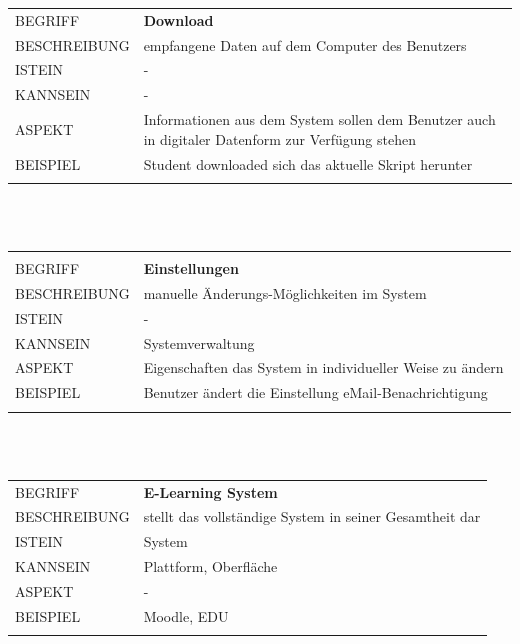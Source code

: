 \documentclass[12pt,a4paper]{article}
\begin{document}
\begin{tabular}{l p{12cm}}
	BEGRIFF 	 & \textbf{Download} \\ 
	BESCHREIBUNG & empfangene Daten auf dem Computer des Benutzers\\ 
	ISTEIN   	 & -\\
	KANNSEIN 	 & -\\ 
	ASPEKT   	 & Informationen aus dem System sollen dem Benutzer auch in digitaler Datenform zur Verfügung stehen\\
	BEISPIEL 	 & Student downloaded sich das aktuelle Skript herunter\\\\
	\hline
\end{tabular}\\\\  

\begin{tabular}{l p{12cm}}
	\hline\\
	BEGRIFF 	 & \textbf{Einstellungen} \\ 
	BESCHREIBUNG & manuelle Änderungs-Möglichkeiten im System \\
	ISTEIN   	 & -\\
	KANNSEIN 	 & Systemverwaltung\\ 
	ASPEKT   	 & Eigenschaften das System in individueller Weise zu ändern\\ 
	BEISPIEL 	 & Benutzer ändert die Einstellung eMail-Benachrichtigung\\\\
	\hline
\end{tabular}\\\\  

\begin{tabular}{l p{12cm}}
	BEGRIFF 	 & \textbf{E-Learning System} \\ 
	BESCHREIBUNG & stellt das vollständige System in seiner Gesamtheit dar\\ 
	ISTEIN   	 & System\\
	KANNSEIN 	 & Plattform, Oberfläche\\ 
	ASPEKT   	 & -\\
	BEISPIEL 	 & Moodle, EDU\\\\
	\hline
\end{tabular}\\\\  
\end{document}
